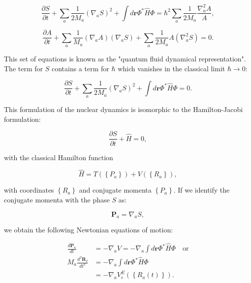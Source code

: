 \begin{equation}
 \frac{\partial S}{\partial t} + \sum_a \frac{1}{2M_a}
    (\nabla_a S)^2 + \int d\bm{r} \Phi^* \hat{H} \Phi
    = \hbar^2 \sum_a \frac{1}{2M_a} \frac{\nabla_a^2 A}{A} , 
\end{equation}

\begin{equation}
 \frac{\partial A}{\partial t} + \sum_a \frac{1}{M_a} (\nabla_a A)
    (\nabla_a S) + \sum_a \frac{1}{2M_a} A (\nabla_a^2 S) = 0 . 
\end{equation}

This set of equations is known as the "quantum fluid dynamical representation".
The term for $S$ contains a term for $\hbar$ which vanishes in
the classical limit $\hbar \rightarrow 0$:

\begin{equation}
 \frac{\partial S}{\partial t} + \sum_a \frac{1}{2M_a}
    (\nabla_a S)^2 + \int d\bm{r} \Phi^* \hat{H} \Phi = 0 . 
\end{equation}

This formulation of the nuclear dynamics is isomorphic
to the Hamilton-Jacobi formulation:

\begin{equation}
 \frac{\partial S}{\partial t} + \hat{H} = 0 , 
\end{equation}

with the classical Hamilton function

\begin{equation}
 \hat{H} = T(\left\{P_a\right\}) + V(\left\{R_a\right\}) , 
\end{equation}

with coordinates $\left\{R_a\right\}$ and conjugate momenta 
$\left\{P_a\right\}$.
If we identify the conjugate momenta with the phase $S$ as:

\begin{equation}
 \bm{P}_a = \nabla_a S , 
\end{equation}

we obtain the following Newtonian equations of motion:

\begin{equation}
    \begin{split}
        \frac{d\bm{P}_a}{dt}
    &= -\nabla_a V
    = -\nabla_a \int d\bm{r} \Phi^* \hat{H} \Phi \quad \text{or} \\
        M_a\frac{d^2 \bm{R}_I}{dt^2}
    &= -\nabla_a \int d\bm{r} \Phi^* \hat{H} \Phi \\
    &= -\nabla_a V_e^E \left(\left\{ R_a(t) \right\}\right) .
    \end{split}
\end{equation}

